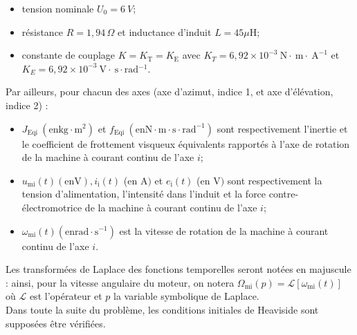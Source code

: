 \begin{itemize}
  \item tension nominale $U_{0}=\SI{6}{V}$;
  \item résistance $R=1,94\,\Omega$ et inductance d'induit $L=45 \mu \mathrm{H}$;
  \item constante de couplage $K=K_{\mathrm{T}}=K_{\mathrm{E}}$ avec $K_{T}=6,92 \times 10^{-3} \mathrm{~N} \cdot \mathrm{~m} \cdot \mathrm{~A}^{-1}$ et $K_{E}=6,92 \times 10^{-3} \mathrm{~V} \cdot \mathrm{~s} \cdot \mathrm{rad}{ }^{-1}$.
\end{itemize}

Par ailleurs, pour chacun des axes (axe d'azimut, indice 1, et axe d'élévation, indice 2) :

\begin{itemize}
  \item $J_{\text {Eqi }}\left(\mathrm{en} \mathrm{kg} \cdot \mathrm{m}^{2}\right)$ et $f_{\text {Eqi }}\left(\mathrm{en} \mathrm{N} \cdot \mathrm{m} \cdot \mathrm{s} \cdot \mathrm{rad}^{-1}\right)$ sont respectivement l'inertie et le coefficient de frottement visqueux équivalents rapportés à l'axe de rotation de la machine à courant continu de l'axe $i$;
  \item $u_{\mathrm{mi}}(t)(\mathrm{en} \mathrm{V}), i_{\mathrm{i}}(t)$ (en A$)$ et $e_{\mathrm{i}}(t)$ (en V$)$ sont respectivement la tension d'alimentation, l'intensité dans l'induit et la force contre-électromotrice de la machine à courant continu de l'axe $i$;
  \item $\omega_{\mathrm{mi}}(t)\left(\mathrm{en} \mathrm{rad} \cdot \mathrm{s}^{-1}\right)$ est la vitesse de rotation de la machine à courant continu de l'axe $i$.
\end{itemize}

Les transformées de Laplace des fonctions temporelles seront notées en majuscule : ainsi, pour la vitesse angulaire du moteur, on notera $\Omega_{\mathrm{mi}}(p)=\mathcal{L}\left[\omega_{\mathrm{mi}}(t)\right]$ où $\mathcal{L}$ est l'opérateur et $p$ la variable symbolique de Laplace.\\
Dans toute la suite du problème, les conditions initiales de Heaviside sont supposées être vérifiées.\\
\ifprof
\begin{corrige}
\end{corrige}
\else
\fi


